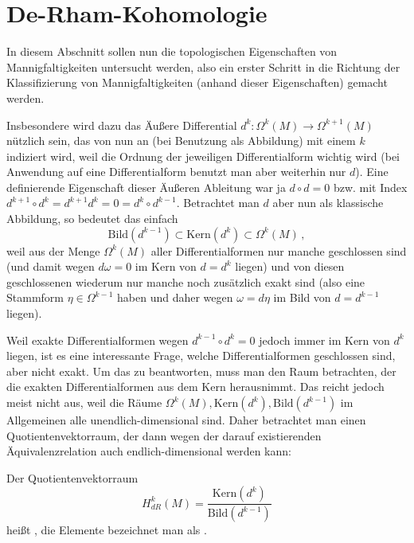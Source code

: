 \documentclass[../H_Analysis_main.tex]{subfiles}
\begin{document}
	\section{De-Rham-Kohomologie}
In diesem Abschnitt sollen nun die topologischen Eigenschaften von Mannigfaltigkeiten untersucht werden, also ein erster Schritt in die Richtung der Klassifizierung von Mannigfaltigkeiten (anhand dieser Eigenschaften) gemacht werden.


Insbesondere wird dazu das Äußere Differential $d^k: \Omega^k(M) \rightarrow \Omega^{k + 1}(M)$ nützlich sein, das von nun an (bei Benutzung als Abbildung) mit einem $k$ indiziert wird, weil die Ordnung der jeweiligen Differentialform wichtig wird (bei Anwendung auf eine Differentialform benutzt man aber weiterhin nur $d$). Eine definierende Eigenschaft dieser Äußeren Ableitung war ja $d \circ d = 0$ bzw. mit Index $d^{k + 1} \circ d^k = d^{k + 1} d^k = 0 = d^k \circ d^{k - 1}$. Betrachtet man $d$ aber nun als klassische Abbildung, so bedeutet das einfach
\begin{equation}
\text{Bild}(d^{k - 1}) \subset \text{Kern}(d^k) \subset \Omega^k(M) \, ,
\end{equation}
weil aus der Menge $\Omega^k(M)$ aller Differentialformen nur manche geschlossen sind (und damit wegen $d\omega = 0$ im Kern von $d = d^k$ liegen) und von diesen geschlossenen wiederum nur manche noch zusätzlich exakt sind (also eine Stammform $\eta \in \Omega^{k - 1}$ haben und daher wegen $\omega = d\eta$ im Bild von $d = d^{k - 1}$ liegen).

Weil exakte Differentialformen wegen $d^{k - 1} \circ d^k = 0$ jedoch immer im Kern von $d^k$ liegen, ist es eine interessante Frage, welche Differentialformen geschlossen sind, aber nicht exakt. Um das zu beantworten, muss man den Raum betrachten, der die exakten Differentialformen aus dem Kern herausnimmt. Das reicht jedoch meist nicht aus, weil die Räume $\Omega^k(M), \text{Kern}(d^k), \text{Bild}(d^{k - 1})$ im Allgemeinen alle unendlich-dimensional sind. Daher betrachtet man einen Quotientenvektorraum, der dann wegen der darauf existierenden Äquivalenzrelation auch endlich-dimensional werden kann:
\begin{defi}
Der Quotientenvektorraum
\begin{equation}
H_{dR}^k(M) = \frac{\text{Kern}(d^k)}{\text{Bild}(d^{k - 1})}
\end{equation}
heißt , die Elemente bezeichnet man als .
\end{defi}
\end{document}
